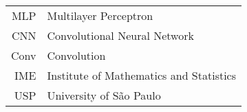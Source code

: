 \documentclass[a4paper,12pt,twoside,brazilian,english]{book}
\begin{document}
\begin{tabular}{rl}
   MLP & Multilayer Perceptron \\
   CNN & Convolutional Neural Network \\
   Conv & Convolution \\
   IME & Institute of Mathematics and Statistics\\
   USP & University of São Paulo
\end{tabular}

\clearpage


\disablenewpage{\listoffigures}

\disablenewpage{\listoftables}


\tableofcontents

\egroup %


\mainmatter

\pagestyle{mainmatter}

\singlespacing

\pagestyle{unnumberedchapter}

% 




\cleardoublepage

\pagestyle{appendix}

\appendix

\addappheadtotoc


\par
\end{document}
